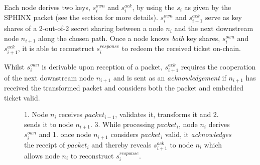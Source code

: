 Each node derives two keys, $s_i^{own}$ and $s_i^{ack}$, by using the $s_i$ as given by the SPHINX packet (see the  section for more details). $s_i^{own}$ and $s_{i+1}^{ack}$ serve as key shares of a 2-out-of-2 secret sharing between a node $n_i$ and the next downstream node $n_{i+1}$ along the chosen path. Once a node knows \textit{both} key shares, $s_i^{own}$ and $s_{i+1}^{ack}$, it is able to reconstruct $s_i^{response}$ to redeem the received ticket on-chain.

Whilst $s_i^{own}$ is derivable upon reception of a packet, $s_{i+1}^{ack}$ requires the cooperation of the next downstream node $n_{i+1}$ and is sent as an \textit{acknowledgement} if $n_{i+1}$ has received the transformed packet and considers both the packet and embedded ticket valid.

\begin{figure}[H]
      \centering
      \caption{\color{hopr-blue}1. \color{black} Node $n_i$ receives $packet_{i-1}$, validates it, transforms it and \color{hopr-blue}2. \color{black} sends it to node $n_{i+1}$. \color{hopr-blue}3. \color{black} While processing $packet_i$, node $n_i$ derives $s_i^{own}$ and \color{hopr-blue}1. \color{black} once node $n_{i+1}$ considers $packet_i$ valid, it \textit{acknowledges} the receipt of $packet_i$ and thereby reveals $s_{i+1}^{ack}$ to node $n_i$ which allows node $n_i$ to reconstruct $s_i^{response}$.}
      \label{fig:proofofrelay}
\end{figure}

